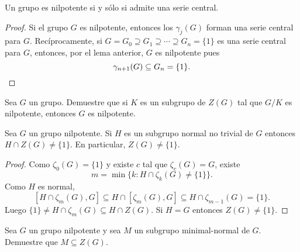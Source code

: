 
\begin{theorem}
	Un grupo es nilpotente si y sólo si admite una serie central.
\end{theorem}

\begin{proof}
	Si el grupo $G$ es nilpotente, entonces los $\gamma_j(G)$ forman una serie
	central para $G$. Recíprocamente, si $G=G_0\supseteq
	G_1\supseteq\cdots\supseteq G_n=\{1\}$ es una serie central para $G$, entonces,
	por el lema anterior, $G$ es nilpotente pues
	\[
	\gamma_{n+1}(G)\subseteq G_n=\{1\}.\qedhere
	\]
\end{proof}

\begin{exercise}
\label{xca:nilpotente_central}
	Sea $G$ un grupo. Demuestre que si $K$ es un subgrupo de $Z(G)$ tal que
	$G/K$ es nilpotente, entonces $G$ es nilpotente.
\end{exercise}

\begin{theorem}[Hirsch]
	\label{theorem:Z(nilpotent)}
	Sea $G$ un grupo nilpotente. Si $H$ es un subgrupo normal no trivial de $G$
	entonces $H\cap Z(G)\ne\{1\}$. En particular, $Z(G)\ne\{1\}$. 
\end{theorem}

\begin{proof}
	Como $\zeta_0(G)=\{1\}$ y existe $c$ tal que $\zeta_c(G)=G$, existe 
	\[
	m=\min\{k:H\cap\zeta_k(G)\ne\{1\}\}.
	\]
	Como $H$ es normal, 
	\[
	[H\cap\zeta_m(G),G]\subseteq H\cap[\zeta_m(G),G]\subseteq H\cap\zeta_{m-1}(G)=\{1\}.
	\]
	Luego $\{1\}\ne H\cap\zeta_m(G)\subseteq H\cap Z(G)$. Si $H=G$ entonces $Z(G)\ne\{1\}$. 
\end{proof}

\begin{exercise}
\label{xca:nilpotente_minimalnormal}
	Sea $G$ un grupo nilpotente y sea $M$ un subgrupo minimal-normal de $G$.
	Demuestre que $M\subseteq Z(G)$.
\end{exercise}


